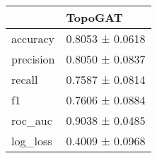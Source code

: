 \begin{tabular}{ll}
\toprule
 & TopoGAT \\
\midrule
accuracy & 0.8053 ± 0.0618 \\
precision & 0.8050 ± 0.0837 \\
recall & 0.7587 ± 0.0814 \\
f1 & 0.7606 ± 0.0884 \\
roc_auc & 0.9038 ± 0.0485 \\
log_loss & 0.4009 ± 0.0968 \\
\bottomrule
\end{tabular}

